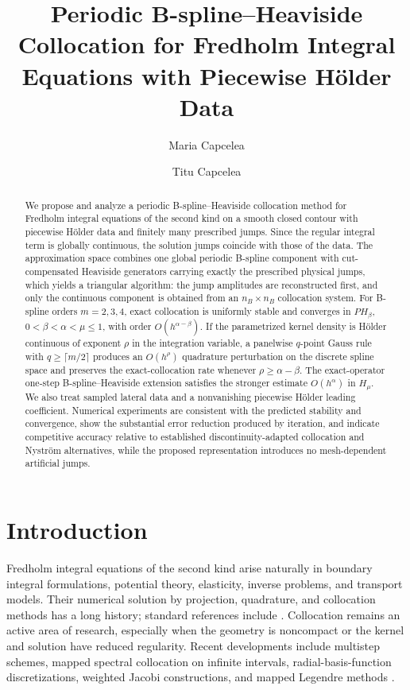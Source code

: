 \documentclass[11pt,a4paper]{amsart}
\title[B-spline--Heaviside Collocation]{Periodic B-spline--Heaviside Collocation for Fredholm Integral Equations with Piecewise H\"older Data}
\author{Maria Capcelea}
\author{Titu Capcelea}
\date{}
\theoremstyle{plain}
\theoremstyle{definition}
\theoremstyle{remark}
\begin{document}
\begin{abstract}
We propose and analyze a periodic B-spline--Heaviside collocation method for Fredholm integral equations of the second kind on a smooth closed contour with piecewise H\"older data and finitely many prescribed jumps. Since the regular integral term is globally continuous, the solution jumps coincide with those of the data. The approximation space combines one global periodic B-spline component with cut-compensated Heaviside generators carrying exactly the prescribed physical jumps, which yields a triangular algorithm: the jump amplitudes are reconstructed first, and only the continuous component is obtained from an $n_B\times n_B$ collocation system. For B-spline orders $m=2,3,4$, exact collocation is uniformly stable and converges in $PH_\beta$, $0<\beta<\alpha<\mu\le1$, with order $O(h^{\alpha-\beta})$. If the parametrized kernel density is H\"older continuous of exponent $\rho$ in the integration variable, a panelwise $q$-point Gauss rule with $q\ge\lceil m/2\rceil$ produces an $O(h^\rho)$ quadrature perturbation on the discrete spline space and preserves the exact-collocation rate whenever $\rho\ge\alpha-\beta$. The exact-operator one-step B-spline--Heaviside extension satisfies the stronger estimate $O(h^\alpha)$ in $H_\mu$. We also treat sampled lateral data and a nonvanishing piecewise H\"older leading coefficient. Numerical experiments are consistent with the predicted stability and convergence, show the substantial error reduction produced by iteration, and indicate competitive accuracy relative to established discontinuity-adapted collocation and Nystr\"om alternatives, while the proposed representation introduces no mesh-dependent artificial jumps.

\end{abstract}

\maketitle

\section{Introduction}\label{sec:introduction}

Fredholm integral equations of the second kind arise naturally in boundary integral formulations, potential theory, elasticity, inverse problems, and transport models.  Their numerical solution by projection, quadrature, and collocation methods has a long history; standard references include \cite{Atkinson,Kress}.  Collocation remains an active area of research, especially when the geometry is noncompact or the kernel and solution have reduced regularity.  Recent developments include multistep schemes, mapped spectral collocation on infinite intervals, radial-basis-function discretizations, weighted Jacobi constructions, and mapped Legendre methods \cite{Wang2022,Rahmoune2021,Molabahrami2023,Allouch2024,Boutarcha2026}.
\end{document}
